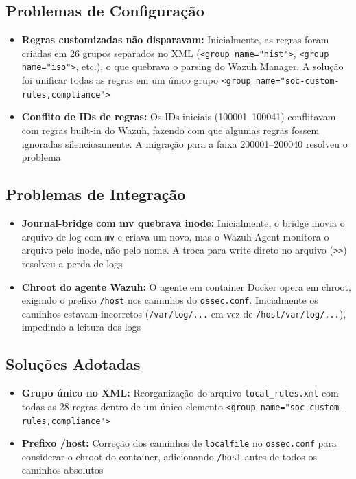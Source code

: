 \documentclass[12pt,a4paper]{article}
\begin{document}
    \subsection{Problemas de Configuração}

    \begin{itemize}
        \item \textbf{Regras customizadas não disparavam:} Inicialmente, as regras foram criadas em 26 grupos separados no XML (\texttt{<group name="nist">}, \texttt{<group name="iso">}, etc.), o que quebrava o parsing do Wazuh Manager. A solução foi unificar todas as regras em um único grupo \texttt{<group name="soc-custom-rules,compliance">}
        \item \textbf{Conflito de IDs de regras:} Os IDs iniciais (100001--100041) conflitavam com regras built-in do Wazuh, fazendo com que algumas regras fossem ignoradas silenciosamente. A migração para a faixa 200001--200040 resolveu o problema
    \end{itemize}

    \subsection{Problemas de Integração}

    \begin{itemize}
        \item \textbf{Journal-bridge com mv quebrava inode:} Inicialmente, o bridge movia o arquivo de log com \texttt{mv} e criava um novo, mas o Wazuh Agent monitora o arquivo pelo inode, não pelo nome. A troca para write direto no arquivo (\texttt{>>}) resolveu a perda de logs
        \item \textbf{Chroot do agente Wazuh:} O agente em container Docker opera em chroot, exigindo o prefixo \texttt{/host} nos caminhos do \texttt{ossec.conf}. Inicialmente os caminhos estavam incorretos (\texttt{/var/log/...} em vez de \texttt{/host/var/log/...}), impedindo a leitura dos logs
    \end{itemize}

    \subsection{Soluções Adotadas}

    \begin{itemize}
        \item \textbf{Grupo único no XML:} Reorganização do arquivo \texttt{local\_rules.xml} com todas as 28 regras dentro de um único elemento \texttt{<group name="soc-custom-rules,compliance">}
        \item \textbf{Prefixo /host:} Correção dos caminhos de \texttt{localfile} no \texttt{ossec.conf} para considerar o chroot do container, adicionando \texttt{/host} antes de todos os caminhos absolutos
    \end{itemize}
\end{document}
